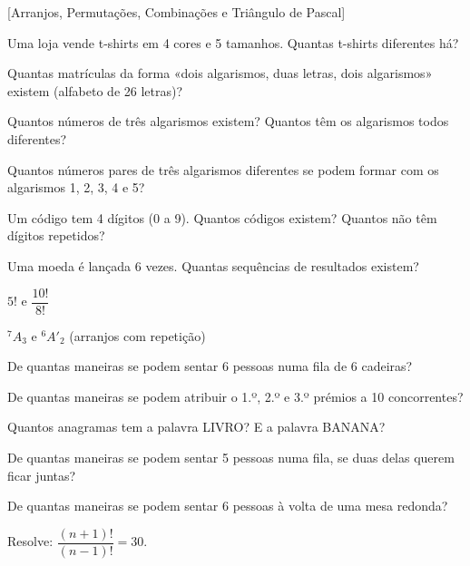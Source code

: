 \documentclass[12pt]{article}
\begin{document}
[Arranjos, Permutações, Combinações e Triângulo de Pascal]


\begin{exercicios}
  \item Uma loja vende t-shirts em 4 cores e 5 tamanhos. Quantas t-shirts diferentes há?
  \item Quantas matrículas da forma «dois algarismos, duas letras, dois algarismos» existem (alfabeto de 26 letras)?
  \item Quantos números de três algarismos existem? Quantos têm os algarismos todos diferentes?
  \item Quantos números pares de três algarismos diferentes se podem formar com os algarismos 1, 2, 3, 4 e 5?
  \item Um código tem 4 dígitos (0 a 9). Quantos códigos existem? Quantos não têm dígitos repetidos?
  \item Uma moeda é lançada 6 vezes. Quantas sequências de resultados existem?
\end{exercicios}

\begin{exercicios}
  \item $5!$ \; e \; $\dfrac{10!}{8!}$
  \item $^7A_3$ \; e \; $^6A'_2$ \; (arranjos com repetição)
  \item De quantas maneiras se podem sentar 6 pessoas numa fila de 6 cadeiras?
  \item De quantas maneiras se podem atribuir o 1.º, 2.º e 3.º prémios a 10 concorrentes?
  \item Quantos anagramas tem a palavra LIVRO? E a palavra BANANA?
  \item De quantas maneiras se podem sentar 5 pessoas numa fila, se duas delas querem ficar juntas?
  \item De quantas maneiras se podem sentar 6 pessoas à volta de uma mesa redonda?
  \item Resolve: $\dfrac{(n + 1)!}{(n - 1)!} = 30$.
\end{exercicios}
\end{document}
